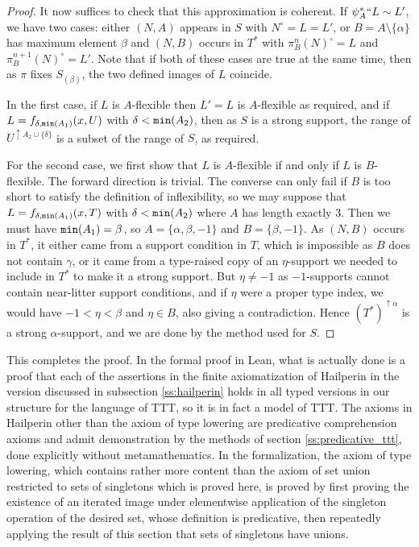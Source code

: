 \documentclass{article}
\theoremstyle{definition}
\theoremstyle{remark}
\begin{document}
\begin{proof}
{
It now suffices to check that this approximation is coherent.
If $\psi_A^*``L \sim L'$, we have two cases: either $(N,A)$ appears in $S$ with $N^\circ = L = L'$, or $B = A\setminus\{\alpha\}$ has maximum element $\beta$ and $(N,B)$ occurs in $T^*$ with $\pi_B^n(N)^\circ = L$ and $\pi_B^{n+1}(N)^\circ = L'$.
Note that if both of these cases are true at the same time, then as $\pi$ fixes $S_{(\beta)}$, the two defined images of $L$ coincide.

In the first case, if $L$ is $A$-flexible then $L' = L$ is $A$-flexible as required, and if $L = f_{\delta,{\tt min}(A_1)}(x,U)$ with $\delta < {\tt min}(A_2)$, then as $S$ is a strong support, the range of $U^{\uparrow A_2 \cup \{\delta\}}$ is a subset of the range of $S$, as required.

For the second case, we first show that $L$ is $A$-flexible if and only if $L$ is $B$-flexible.
The forward direction is trivial.
The converse can only fail if $B$ is too short to satisfy the definition of inflexibility, so we may suppose that $L = f_{\delta,{\tt min}(A_1)}(x,T)$ with $\delta < {\tt min}(A_2)$ where $A$ has length exactly 3.
Then we must have ${\tt min}(A_1) = \beta$, so $A = \{\alpha,\beta,-1\}$ and $B = \{\beta,-1\}$.
As $(N,B)$ occurs in $T^*$, it either came from a support condition in $T$, which is impossible as $B$ does not contain $\gamma$, or it came from a type-raised copy of an $\eta$-support we needed to include in $T^*$ to make it a strong support.
But $\eta \neq -1$ as $-1$-supports cannot contain near-litter support conditions, and if $\eta$ were a proper type index, we would have $-1 < \eta < \beta$ and $\eta \in B$, also giving a contradiction.
Hence $(T^*)^{\uparrow\alpha}$ is a strong $\alpha$-support, and we are done by the method used for $S$.
}


\end{proof}

This completes the proof.  In the formal proof in Lean, what is actually done is a proof that each of the assertions in the finite axiomatization of Hailperin in the version discussed in {subsection \ref{ss:hailperin}}  holds in all typed versions in our structure for the language of TTT, so it is in fact a model of TTT.  The axioms in Hailperin other than the axiom of type lowering are predicative comprehension axioms and
admit demonstration by the methods of section \ref{ss:predicative_ttt}, done explicitly without metamathematics.  In the formalization, the axiom of type lowering, which contains rather more content than the axiom of set union restricted to sets of singletons which is proved here, is proved by first proving the existence of an iterated image under elementwise application of the singleton operation of the desired set, whose definition is predicative, then repeatedly applying the result of this section that sets of singletons have unions.
\end{document}
